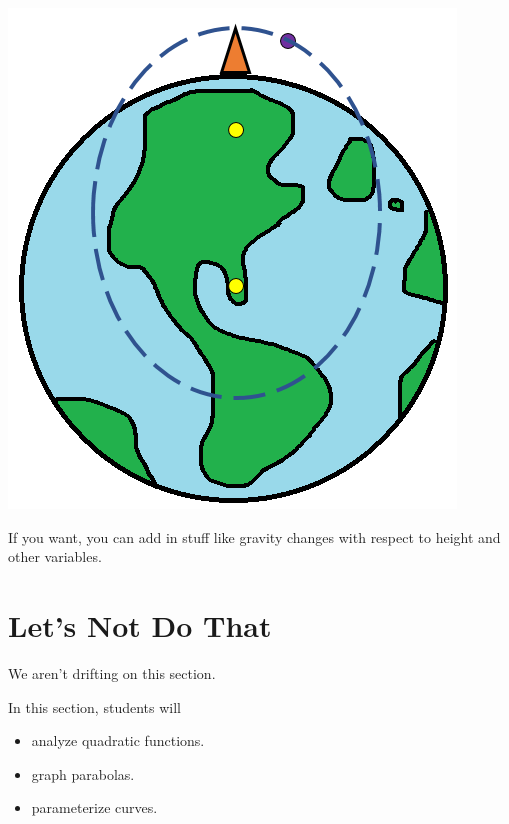 \documentclass{ximera}
\begin{document}
\begin{center}
\includegraphics{Earth-Gravity.png}
\end{center}


If you want, you can add in stuff like gravity changes with respect to height and other variables.






\section{Let's Not Do That}


We aren't drifting on this section.





















\begin{sectionOutcomes}
In this section, students will 

\begin{itemize}
\item analyze quadratic functions.
\item graph parabolas.
\item parameterize curves.
\end{itemize}
\end{sectionOutcomes}
\end{document}
